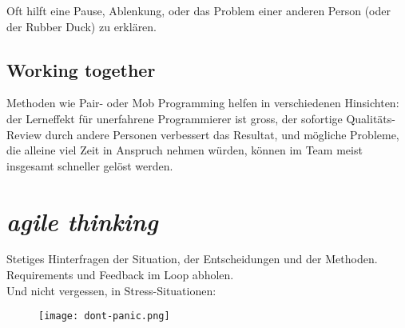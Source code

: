 \documentclass[10pt, oneside]{article}
\begin{document}
Oft hilft eine Pause, Ablenkung, oder das Problem einer anderen Person (oder der Rubber Duck) zu erklären.

\subsection{Working together}
Methoden wie Pair- oder Mob Programming helfen in verschiedenen Hinsichten: der Lerneffekt für unerfahrene Programmierer ist gross, der sofortige Qualitäts-Review durch
andere Personen verbessert das Resultat, und mögliche Probleme, die alleine viel Zeit in Anspruch nehmen würden, können im Team meist insgesamt schneller gelöst werden.

\section{\emph{agile thinking}}
Stetiges Hinterfragen der Situation, der Entscheidungen und der Methoden.\\
Requirements und Feedback im Loop abholen.\\

Und nicht vergessen, in Stress-Situationen:

\begin{figure}[h]
    \centering
    \texttt{[image: dont-panic.png]}
\end{figure}
\end{document}
